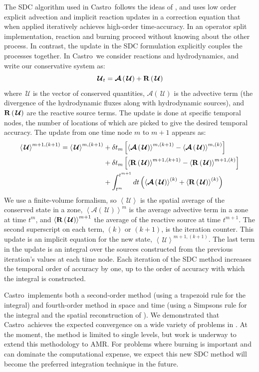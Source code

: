 \documentclass[a4paper]{jpconf}
\newcommand{\castro}{{\sffamily Castro}}
\newcommand{\Uc}{{\,\bm{\mathcal{U}}}}
\newcommand{\Advs}[1]{\boldsymbol{\mathcal{A}} \left(#1\right)}
\newcommand{\avg}[1]{{\left \langle #1 \right \rangle}}
\newcommand{\Rbs}[1]{{\bf R} \left ( #1 \right )}
\begin{document}
The SDC algorithm used in \castro\ follows the ideas of
\cite{dutt:2000,minion:2003}, and uses low order explicit advection
and implicit reaction updates in a correction equation that when
applied iteratively achieves high-order time-accuracy.  In an operator
split implementation, reaction and burning proceed without knowing
about the other process.  In contrast, the update in the SDC
formulation explicitly couples the processes together.  In \castro\ we
consider reactions and hydrodynamics, and write our conservative
system as:
\begin{equation}
\Uc_t = \Advs{\Uc} + \Rbs{\Uc}
\end{equation}
where $\Uc$ is the vector of conserved quantities, $\Advs{\Uc}$ is the
advective term (the divergence of the hydrodynamic fluxes along with
hydrodynamic sources), and $\Rbs{\Uc}$ are the reactive source terms.
The update is done at specific temporal nodes, the number of locations
of which are picked to give the desired temporal accuracy.  The update
from one time node $m$ to $m+1$ appears as:
    \begin{align}
      \label{eq:sdc:general}
      \avg{\Uc}^{{m+1},(k+1)} = \avg{\Uc}^{m,(k+1)}
            &+ \delta t_m \left [ \avg{\Advs{\Uc}}^{m,(k+1)} - \avg{\Advs{\Uc}}^{m,(k)} \right ] \nonumber \\
            &+ \delta t_m \left [ \avg{\Rbs{\Uc}}^{{m+1},(k+1)} - \avg{\Rbs{\Uc}}^{{m+1},(k)} \right ] \nonumber \\
            &+ \int_{t^m}^{t^{m+1}} dt  \left (\avg{\Advs{\Uc}}^{(k)} + \avg{\Rbs{\Uc}}^{(k)}\right)
   \end{align}
We use a finite-volume formalism, so $\avg{\Uc}$ is the spatial average of the
conserved state in a zone, $\avg{\Advs{\Uc}}^m$ is the average
advective term in a zone at time $t^m$, and $\avg{\Rbs{\Uc}}^{m+1}$
the average of the reactive source at time $t^{m+1}$.  The second
superscript on each term, $(k)$ or $(k+1)$, is the iteration counter.  This
update is an implicit equation for the new state,
$\avg{\Uc}^{{m+1},(k+1)}$.  The last term in the update is an integral
over the sources constructed from the previous iteration's values at
each time node.  Each iteration of the SDC method increases the
temporal order of accuracy by one, up to the order of accuracy with
which the integral is constructed.  

\castro\ implements both a second-order method (using a trapezoid rule
for the integral) and fourth-order method in space and time (using a
Simpsons rule for the integral and the spatial reconstruction of
\cite{mccorquodalecolella}).  We demonstrated that \castro\ achieves
the expected convergence on a wide variety of problems in
\cite{castro:sdc}.  At the moment, the method is limited to single
levels, but work is underway to extend this methodology to AMR.  For
problems where burning is important and can dominate the computational
expense, we expect this new SDC method will become the preferred
integration technique in the future.
\end{document}
